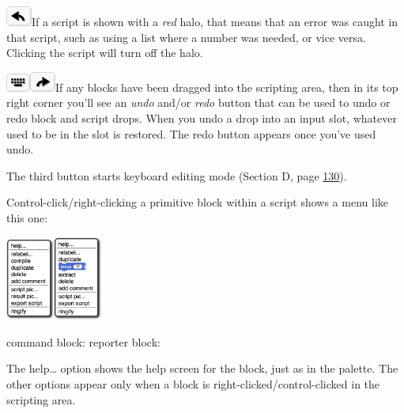 \includegraphics[width=0.33333in,height=0.26042in]{media/image1066.png}If
a script is shown with a \emph{red} halo, that means that an error was
caught in that script, such as using a list where a number was needed,
or vice versa. Clicking the script will turn off the halo.

\includegraphics[width=0.3125in,height=0.23958in]{media/image1067.png}\includegraphics[width=0.33333in,height=0.26042in]{media/image1068.png}If
any blocks have been dragged into the scripting area, then in its top
right corner you'll see an \emph{undo} and/or \emph{redo} button that
can be used to undo or redo block and script drops. When you undo a drop
into an input slot, whatever used to be in the slot is restored. The
redo button appears once you've used undo.

The third button starts keyboard editing mode (Section D, page
\hyperref[keyboard-editing]{130}).

Control-click/right-clicking a primitive block within a script shows a
menu like this one:

\includegraphics[width=0.62083in,height=1.0625in]{media/image1069.png}\includegraphics[width=0.62639in,height=1.09028in]{media/image1070.png}

command block: reporter block:

The help\ldots{} option shows the help screen for the block, just as in
the palette. The other options appear only when a block is
right-clicked/control-clicked in the scripting area.

